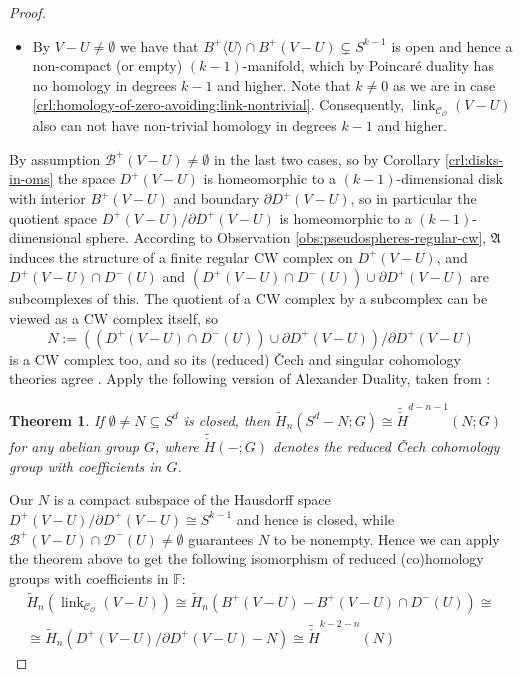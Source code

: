 \documentclass[a4paper,11pt,reqno, english]{amsart}
\newtheorem{theorem}{Theorem}[section]
\theoremstyle{definition}
\theoremstyle{remark}
\DeclareMathOperator{\link}{\mathrm{link}}
\begin{document}
\begin{proof}
\begin{itemize}
        \item[\ref{crl:homology-of-zero-avoiding:link-nontrivial:lower-bound}] By $V-U\neq\emptyset$ we have  that $B^+\langle U\rangle\cap B^+(V-U)\subsetneq S^{k-1}$ is open and hence a non-compact (or empty) $(k-1)$-manifold, which by Poincar\'e duality has no homology in degrees $k-1$ and higher. Note that $k\neq 0$ as we are in case \ref{crl:homology-of-zero-avoiding:link-nontrivial}. Consequently, $\link_{\mathscr{C}_\mathscr{O}}(V-U)$ also can not have non-trivial homology in degrees $k-1$ and higher.
    \end{itemize}
    By assumption $\mathscr{B}^+(V-U)\neq\emptyset$ in the last two cases, so by Corollary \ref{crl:disks-in-oms} the space $D^+(V-U)$ is homeomorphic to a $(k-1)$-dimensional disk with interior $B^+(V-U)$ and boundary $\partial D^+(V-U)$, so in particular the quotient space $D^+(V-U)/\partial D^+(V-U)$ is homeomorphic to a $(k-1)$-dimensional sphere. According to Observation \ref{obs:pseudospheres-regular-cw}, $\mathfrak{A}$ induces the structure of a finite regular CW complex on $D^+(V-U)$, and $D^+(V-U)\cap D^-(U)$ and $(D^+(V-U)\cap D^-(U))\cup\partial D^+(V-U)$ are subcomplexes of this. The quotient of a CW complex by a subcomplex can be viewed as a CW complex itself, so 
    \[
        N:=((D^+(V-U)\cap D^-(U))\cup\partial D^+(V-U))/\partial D^+(V-U)
    \] 
    is a CW complex too, and so its (reduced) Čech and singular cohomology theories agree \cite[Chapter VI.8]{Bredon2010}. Apply the following version of Alexander Duality, taken from \cite[Corollary VI.8.7]{Bredon2010}:
    \begin{theorem}
        If $\emptyset\neq N\subseteq S^d$ is closed, then $\tilde{H}_n(S^d-N;G)\cong\tilde{\check{H}}^{d-n-1}(N;G)$ for any abelian group $G$, where $\tilde{\check{H}}(-;G)$ denotes the reduced Čech cohomology group with coefficients in $G$.
    \end{theorem}
    Our $N$ is a compact subspace of the Hausdorff space $D^+(V-U)/\partial D^+(V-U)\cong S^{k-1}$ and hence is closed, while $\mathscr{B}^+(V-U)\cap\mathscr{D}^-(U)\neq\emptyset$ guarantees $N$ to be nonempty. Hence we can apply the theorem above to get the following isomorphism of reduced (co)homology groups with coefficients in $\mathbb{F}$:
    \begin{multline*}
        \tilde{H}_n(\link_{\mathscr{C}_\mathscr{O}}(V-U))
        \cong\tilde{H}_n(B^+(V-U)-B^+(V-U)\cap D^-(U))
        \cong\\\cong\tilde{H}_n(D^+(V-U)/\partial D^+(V-U)-N)
        \cong\tilde{\check{H}}^{k-2-n}(N)

\end{multline*}
\end{proof}
\end{document}
